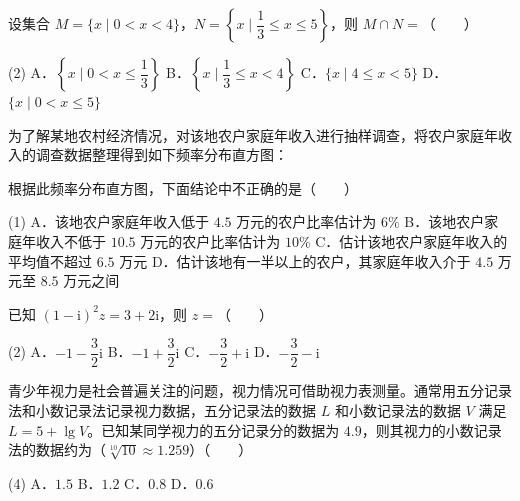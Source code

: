 \begin{question}
设集合 $M=\{x\mid 0<x<4\}$，$N=\left\{x\mid \dfrac13\leqslant x\leqslant5\right\}$，则 $M\cap N=$\mbox{（　　）}

\begin{gkopts}(2)
\task A．$\left\{x\mid 0<x\leqslant\dfrac13\right\}$
\task B．$\left\{x\mid\dfrac13\leqslant x<4\right\}$
\task C．$\{x\mid4\leqslant x<5\}$
\task D．$\{x\mid0<x\leqslant5\}$
\end{gkopts}

\Needspace{0.4\textheight}
\end{question}
\begin{question}
为了解某地农村经济情况，对该地农户家庭年收入进行抽样调查，将农户家庭年收入的调查数据整理得到如下频率分布直方图：
\nopagebreak[4]
\begin{center}\end{center}
\nopagebreak[4]
根据此频率分布直方图，下面结论中不正确的是\mbox{（　　）}

\begin{gkopts}(1)
\task A．该地农户家庭年收入低于 $4.5$ 万元的农户比率估计为 $6\%$
\task B．该地农户家庭年收入不低于 $10.5$ 万元的农户比率估计为 $10\%$
\task C．估计该地农户家庭年收入的平均值不超过 $6.5$ 万元
\task D．估计该地有一半以上的农户，其家庭年收入介于 $4.5$ 万元至 $8.5$ 万元之间
\end{gkopts}

\end{question}
\begin{question}
已知 $(1-\mathrm i)^2z=3+2\mathrm i$，则 $z=$\mbox{（　　）}

\begin{gkopts}(2)
\task A．$-1-\dfrac32\mathrm i$
\task B．$-1+\dfrac32\mathrm i$
\task C．$-\dfrac32+\mathrm i$
\task D．$-\dfrac32-\mathrm i$
\end{gkopts}

\end{question}
\begin{question}
青少年视力是社会普遍关注的问题，视力情况可借助视力表测量。通常用五分记录法和小数记录法记录视力数据，五分记录法的数据 $L$ 和小数记录法的数据 $V$ 满足 $L=5+\lg V$。已知某同学视力的五分记录分的数据为 $4.9$，则其视力的小数记录法的数据约为（$\sqrt[10]{10}\approx1.259$）\mbox{（　　）}

\begin{gkopts}(4)
\task A．$1.5$
\task B．$1.2$
\task C．$0.8$
\task D．$0.6$
\end{gkopts}

\end{question}
